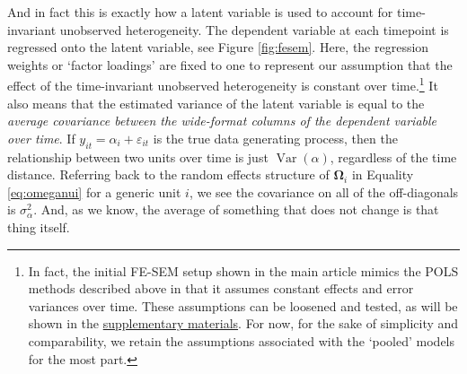 \documentclass[]{interact}
\theoremstyle{plain}%
\theoremstyle{definition}
\theoremstyle{remark}
\begin{document}
And in fact this is exactly how a latent variable is used to account for
time-invariant unobserved heterogeneity. The dependent variable at each
timepoint is regressed onto the latent variable, see Figure
\ref{fig:fesem}. Here, the regression weights or `factor loadings' are
fixed to one to represent our assumption that the effect of the
time-invariant unobserved heterogeneity is constant over
time.\footnote{In fact, the initial FE-SEM setup shown in the main
  article mimics the POLS methods described above in that it assumes
  constant effects and error variances over time. These assumptions can
  be loosened and tested, as will be shown in the
  \href{https://github.com/henrik-andersen/FE-SEM/blob/master/extensions.pdf}{supplementary
  materials}. For now, for the sake of simplicity and comparability, we
  retain the assumptions associated with the `pooled' models for the
  most part.} It also means that the estimated variance of the latent
variable is equal to the
\textit{average covariance between the wide-format columns of the dependent variable over time}.
If \(y_{it} = \alpha_{i} + \varepsilon_{it}\) is the true data
generating process, then the relationship between two units over time is
just \(\mathop{\mathrm{\mathrm{Var}}}(\alpha)\), regardless of the time
distance. Referring back to the random effects structure of
\(\bm{\Omega}_{i}\) in Equality \eqref{eq:omeganui} for a generic unit
\(i\), we see the covariance on all of the off-diagonals is
\(\sigma^{2}_{\alpha}\). And, as we know, the average of something that
does not change is that thing itself.
\end{document}
